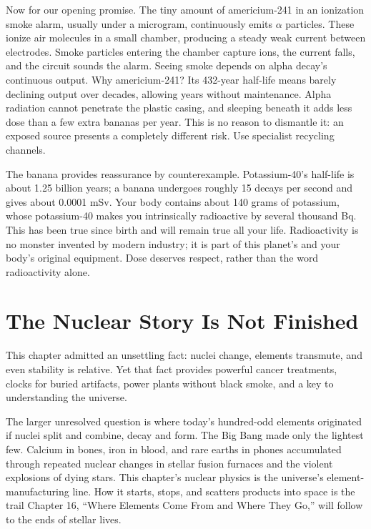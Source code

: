 Now for our opening promise. The tiny amount of americium-241 in an ionization smoke alarm, usually under a microgram, continuously emits $\alpha$ particles. These ionize air molecules in a small chamber, producing a steady weak current between electrodes. Smoke particles entering the chamber capture ions, the current falls, and the circuit sounds the alarm. Seeing smoke depends on alpha decay's continuous output. Why americium-241? Its 432-year half-life means barely declining output over decades, allowing years without maintenance. Alpha radiation cannot penetrate the plastic casing, and sleeping beneath it adds less dose than a few extra bananas per year. This is no reason to dismantle it: an exposed source presents a completely different risk. Use specialist recycling channels.

The banana provides reassurance by counterexample. Potassium-40's half-life is about 1.25 billion years; a banana undergoes roughly 15 decays per second and gives about 0.0001 mSv. Your body contains about 140 grams of potassium, whose potassium-40 makes you intrinsically radioactive by several thousand Bq. This has been true since birth and will remain true all your life. Radioactivity is no monster invented by modern industry; it is part of this planet's and your body's original equipment. Dose deserves respect, rather than the word radioactivity alone.

\section{The Nuclear Story Is Not Finished}

This chapter admitted an unsettling fact: nuclei change, elements transmute, and even stability is relative. Yet that fact provides powerful cancer treatments, clocks for buried artifacts, power plants without black smoke, and a key to understanding the universe.

The larger unresolved question is where today's hundred-odd elements originated if nuclei split and combine, decay and form. The Big Bang made only the lightest few. Calcium in bones, iron in blood, and rare earths in phones accumulated through repeated nuclear changes in stellar fusion furnaces and the violent explosions of dying stars. This chapter's nuclear physics is the universe's element-manufacturing line. How it starts, stops, and scatters products into space is the trail Chapter 16, ``Where Elements Come From and Where They Go,'' will follow to the ends of stellar lives.

